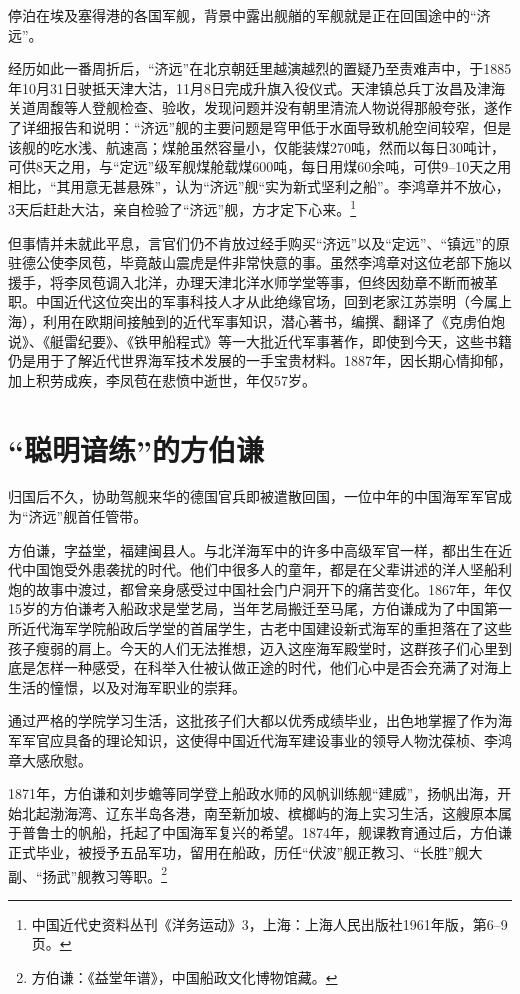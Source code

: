 \documentclass[12pt,UTF8]{ctexbook}
\begin{document}
停泊在埃及塞得港的各国军舰，背景中露出舰艏的军舰就是正在回国途中的“济远”。

经历如此一番周折后，“济远”在北京朝廷里越演越烈的置疑乃至责难声中，于1885年10月31日驶抵天津大沽，11月8日完成升旗入役仪式。天津镇总兵丁汝昌及津海关道周馥等人登舰检查、验收，发现问题并没有朝里清流人物说得那般夸张，遂作了详细报告和说明：“济远”舰的主要问题是穹甲低于水面导致机舱空间较窄，但是该舰的吃水浅、航速高；煤舱虽然容量小，仅能装煤270吨，然而以每日30吨计，可供8天之用，与“定远”级军舰煤舱载煤600吨，每日用煤60余吨，可供9--10天之用相比，“其用意无甚悬殊”，认为“济远”舰“实为新式坚利之船”。李鸿章并不放心，3天后赶赴大沽，亲自检验了“济远”舰，方才定下心来。\footnote{中国近代史资料丛刊《洋务运动》3，上海：上海人民出版社1961年版，第6--9页。}

但事情并未就此平息，言官们仍不肯放过经手购买“济远”以及“定远”、“镇远”的原驻德公使李凤苞，毕竟敲山震虎是件非常快意的事。虽然李鸿章对这位老部下施以援手，将李凤苞调入北洋，办理天津北洋水师学堂等事，但终因劾章不断而被革职。中国近代这位突出的军事科技人才从此绝缘官场，回到老家江苏崇明（今属上海），利用在欧期间接触到的近代军事知识，潜心著书，编撰、翻译了《克虏伯炮说》、《艇雷纪要》、《铁甲船程式》等一大批近代军事著作，即使到今天，这些书籍仍是用于了解近代世界海军技术发展的一手宝贵材料。1887年，因长期心情抑郁，加上积劳成疾，李凤苞在悲愤中逝世，年仅57岁。

\section{“聪明谙练”的方伯谦}

归国后不久，协助驾舰来华的德国官兵即被遣散回国，一位中年的中国海军军官成为“济远”舰首任管带。

方伯谦，字益堂，福建闽县人。与北洋海军中的许多中高级军官一样，都出生在近代中国饱受外患袭扰的时代。他们中很多人的童年，都是在父辈讲述的洋人坚船利炮的故事中渡过，都曾亲身感受过中国社会门户洞开下的痛苦变化。1867年，年仅15岁的方伯谦考入船政求是堂艺局，当年艺局搬迁至马尾，方伯谦成为了中国第一所近代海军学院船政后学堂的首届学生，古老中国建设新式海军的重担落在了这些孩子瘦弱的肩上。今天的人们无法推想，迈入这座海军殿堂时，这群孩子们心里到底是怎样一种感受，在科举入仕被认做正途的时代，他们心中是否会充满了对海上生活的憧憬，以及对海军职业的崇拜。

通过严格的学院学习生活，这批孩子们大都以优秀成绩毕业，出色地掌握了作为海军军官应具备的理论知识，这使得中国近代海军建设事业的领导人物沈葆桢、李鸿章大感欣慰。

1871年，方伯谦和刘步蟾等同学登上船政水师的风帆训练舰“建威”，扬帆出海，开始北起渤海湾、辽东半岛各港，南至新加坡、槟榔屿的海上实习生活，这艘原本属于普鲁士的帆船，托起了中国海军复兴的希望。1874年，舰课教育通过后，方伯谦正式毕业，被授予五品军功，留用在船政，历任“伏波”舰正教习、“长胜”舰大副、“扬武”舰教习等职。\footnote{方伯谦：《益堂年谱》，中国船政文化博物馆藏。}
\end{document}
